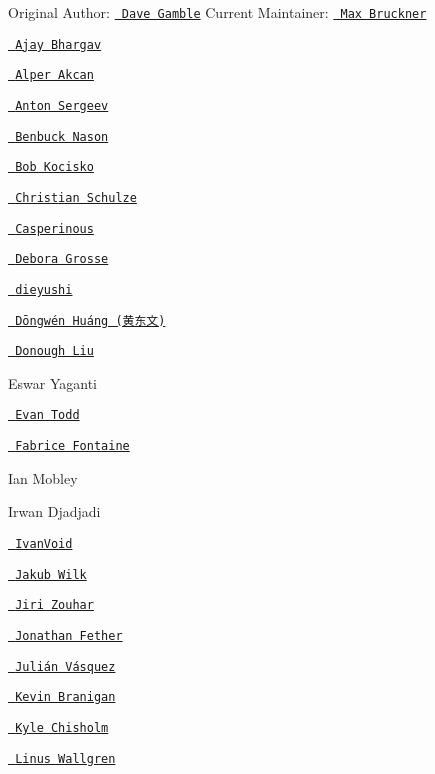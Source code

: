 Original Author\+: \href{https://github.com/DaveGamble}{\texttt{ Dave Gamble}} Current Maintainer\+: \href{https://github.com/FSMaxB}{\texttt{ Max Bruckner}}


\begin{DoxyItemize}
\item \href{https://github.com/ajaybhargav}{\texttt{ Ajay Bhargav}}
\item \href{https://github.com/alperakcan}{\texttt{ Alper Akcan}}
\item \href{https://github.com/anton-sergeev}{\texttt{ Anton Sergeev}}
\item \href{https://github.com/bnason-nf}{\texttt{ Benbuck Nason}}
\item \href{https://github.com/bobkocisko}{\texttt{ Bob Kocisko}}
\item \href{https://github.com/ChristianSch}{\texttt{ Christian Schulze}}
\item \href{https://github.com/Casperinous}{\texttt{ Casperinous}}
\item \href{https://github.com/DeboraG}{\texttt{ Debora Grosse}}
\item \href{https://github.com/dieyushi}{\texttt{ dieyushi}}
\item \href{https://github.com/DongwenHuang}{\texttt{ Dōngwén Huáng (黄东文)}}
\item \href{https://github.com/ldm0}{\texttt{ Donough Liu}}
\item Eswar Yaganti
\item \href{https://github.com/etodd}{\texttt{ Evan Todd}}
\item \href{https://github.com/ffontaine}{\texttt{ Fabrice Fontaine}}
\item Ian Mobley
\item Irwan Djadjadi
\item \href{https://github.com/npi3pak}{\texttt{ Ivan\+Void}}
\item \href{https://github.com/jwilk}{\texttt{ Jakub Wilk}}
\item \href{https://github.com/loigu}{\texttt{ Jiri Zouhar}}
\item \href{https://github.com/jfether}{\texttt{ Jonathan Fether}}
\item \href{https://github.com/juvasquezg}{\texttt{ Julián Vásquez}}
\item \href{https://github.com/kbranigan}{\texttt{ Kevin Branigan}}
\item \href{https://github.com/ChisholmKyle}{\texttt{ Kyle Chisholm}}
\item \href{https://github.com/ecksun}{\texttt{ Linus Wallgren}}

\end{DoxyItemize}
